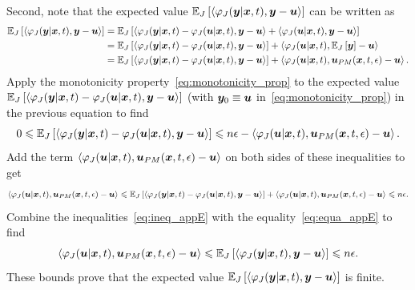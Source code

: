Second, note that the expected value $\expectationJ{\left\langle \varphi_{J}(\by|\bx,t), \by-\bu \right\rangle}$ can be written as
\begin{equation}\label{eq:equa_appE}
\begin{alignedat}{1}
\expectationJ{\left\langle \varphi_{J}(\by|\bx,t), \by-\bu \right\rangle} &= \expectationJ{\left\langle \varphi_{J}(\by|\bx,t)-\varphi_{J}(\bu|\bx,t), \by-\bu \right\rangle + \left\langle \varphi_{J}(\bu|\bx,t), \by-\bu \right\rangle} \\
&= \expectationJ{\left\langle \varphi_{J}(\by|\bx,t)-\varphi_{J}(\bu|\bx,t), \by-\bu \right\rangle} + \left\langle \varphi_{J}(\bu|\bx,t), \expectationJ{\by}-\bu \right\rangle \\
&= \expectationJ{\left\langle \varphi_{J}(\by|\bx,t)-\varphi_{J}(\bu|\bx,t), \by-\bu \right\rangle} + \left\langle \varphi_{J}(\bu|\bx,t), \bu_{PM}(\bx,t,\epsilon)-\bu \right\rangle.
\end{alignedat}
\end{equation}
Apply the monotonicity property~\eqref{eq:monotonicity_prop} to the expected value $\expectationJ{\left\langle \varphi_{J}(\by|\bx,t)-\varphi_{J}(\bu|\bx,t), \by-\bu \right\rangle}$ (with $\by_0 \equiv \bu$ in~\eqref{eq:monotonicity_prop}) in the previous equation to find
\[
0 \leqslant \expectationJ{\left\langle \varphi_{J}(\by|\bx,t)-\varphi_{J}(\bu|\bx,t), \by-\bu \right\rangle} \leqslant n\epsilon - \left\langle \varphi_{J}(\bu|\bx,t), \bu_{PM}(\bx,t,\epsilon)-\bu \right\rangle.
\]
Add the term $\left\langle \varphi_{J}(\bu|\bx,t), \bu_{PM}(\bx,t,\epsilon)-\bu \right\rangle$ on both sides of these inequalities to get
\begin{equation}\label{eq:ineq_appE}
\left\langle \varphi_{J}(\bu|\bx,t), \bu_{PM}(\bx,t,\epsilon)-\bu \right\rangle \leqslant \expectationJ{\left\langle \varphi_{J}(\by|\bx,t)-\varphi_{J}(\bu|\bx,t), \by-\bu \right\rangle} + \left\langle \varphi_{J}(\bu|\bx,t), \bu_{PM}(\bx,t,\epsilon)-\bu \right\rangle \leqslant n\epsilon.
\end{equation}
Combine the inequalities~\eqref{eq:ineq_appE} with the equality~\eqref{eq:equa_appE} to find
\[
\left\langle \varphi_{J}(\bu|\bx,t), \bu_{PM}(\bx,t,\epsilon)-\bu \right\rangle \leqslant \expectationJ{\left\langle \varphi_{J}(\by|\bx,t), \by-\bu \right\rangle} \leqslant n\epsilon.
\]
These bounds prove that the expected value $\expectationJ{\left\langle \varphi_{J}(\by|\bx,t), \by-\bu \right\rangle}$ is finite.


